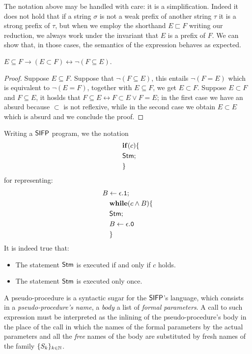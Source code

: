 The notation above may be handled with care: it is a simplification. Indeed it
does not hold that if a string $\sigma$ is not a weak prefix of another string $\tau$
it is a strong prefix of $\tau$, but when we employ the shorthand $E \sqsubset F$
writing our reduction, we always work under the invariant that $E$ is a prefix of $F$.
%
We can show that, in those cases, the semantics of the expression behaves as expected.

\begin{remark}
  $E \subseteq F \to (E \subset F) \leftrightarrow \lnot (F \subseteq E)$.
\end{remark}
\begin{proof}
  Suppose $E\subseteq F$. Suppose that $\lnot (F \subseteq E)$, this entails $\lnot (F=E)$ which is equivalent to $\lnot (E=F)$, together with $E\subseteq F$, we get $E \subset F$.
  Suppose $E \subset F$ and $F \subseteq E$, it hoslds that $F \subseteq E\leftrightarrow F\subset E \lor F = E$; in the first case we have an absurd because $\subset$ is not reflexive, while in the second case we obtain $E\subset E$ which is absurd and we conclude the proof.
\end{proof}

\begin{notation}
\label{remark:if}
Writing a $\mathsf{SIFP}$ program, we the notation
\begin{align*}
&\quad\mathbf{if}(c)\{\\
&\quad\mathsf{Stm};\\
&\quad\}
\end{align*}
for representing:
\begin{align*}
&B \leftarrow \epsilon.\mathtt{1}; \\
&\quad\mathbf{while}(c \land B)\{\\
&\quad\mathsf{Stm};\\
&\quad B \leftarrow \epsilon.\mathtt{0}\\
&\quad\}
\end{align*}
It is indeed true that:
\begin{itemize}
\item The statement $\mathsf{Stm}$ is executed if and only if $c$ holds.
\item The statement $\mathsf{Stm}$ is executed only once.
\end{itemize}
\end{notation}

\begin{notation}
A pseudo-procedure is a syntactic sugar for the $\mathsf{SIFP}$'s language, which consists in a \emph{pseudo-procedure's name}, a \emph{body} a list of \emph{formal parameters}. A call to such expression must be interpreted as the inlining of the pseudo-procedure's body in the place of the call in which the names of the formal parameters by the actual parameters and all the \emph{free} names of the body are substituted by fresh names of the family $\{S_k\}_{k \in \mathbb{N}}$.
\end{notation}

